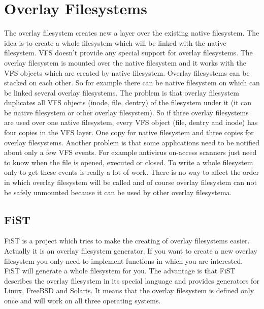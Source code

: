 \chapter{Overlay Filesystems}
\label{lab:overlay}
The overlay filesystem creates new a layer over the existing native filesystem. The idea is to
create a whole filesystem which will be linked with the native filesystem. VFS doesn't
provide any special support for overlay filesystems. The overlay filesystem is mounted
over the native filesystem and it works with the VFS objects which are created by native
filesystem. Overlay filesystems can be stacked on each other. So for example there can
be native filesystem on which can be linked several overlay filesystems. The problem is
that overlay filesystem duplicates all VFS objects (inode, file, dentry) of the filesystem
under it (it can be native filesystem or other overlay filesystem). So if three
overlay filesystems are used over one native filesystem, every VFS object (file,
dentry and inode) has four copies in the VFS layer. One copy for native filesystem and
three copies for overlay filesystems. Another problem is that some applications need to
be notified about only a few VFS events. For example antivirus on-access
scanners just
need to know when the file is opened, executed or closed. To write a whole filesystem only
to get these events is really a lot of work. There is no way to affect the order in
which overlay filesystem will be called and of course overlay filesystem can not be
safely unmounted because it can be used by other overlay filesystema.

\section{FiST}
FiST is a project which tries to make the creating of overlay filesystems easier. Actually
it is an overlay filesystem generator. If you want to create a new overlay filesystem you
only need to implement functions in which you are interested. FiST will generate
a whole
filesystem for you. The advantage is that FiST describes the overlay filesystem in its special
language and provides generators for Linux, FreeBSD and Solaris. It means that the
overlay filesystem is defined only once and will work on all three operating systems.
